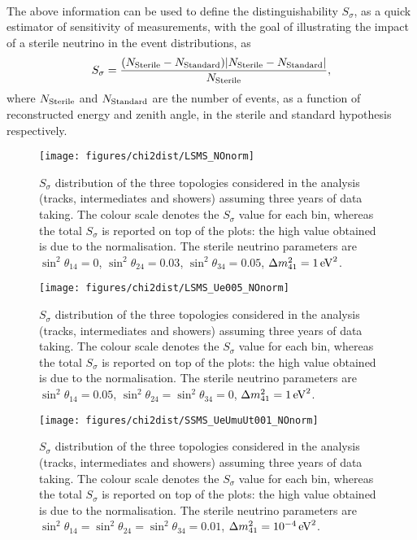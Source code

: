 \\
The above information can be used to define the distinguishability $S_\sigma$, as a quick estimator of sensitivity of measurements, with the goal of illustrating the impact of a sterile neutrino in the event distributions, as
\begin{equation}
S_{\sigma} = \frac{(N_{\rm Sterile} - N_{\rm Standard}) |N_{\rm Sterile} - N_{\rm Standard}|}{N_{\rm Sterile} },
\end{equation}
where $N_{\rm Sterile}$ and $N_{\rm Standard}$ are the number of events, as a function of reconstructed energy and zenith angle, in the sterile and standard hypothesis respectively.
\begin{figure}
	\centering
	\texttt{[image: figures/chi2dist/LSMS\_NOnorm]}
	\caption{$S_\sigma$ distribution of the three topologies considered in the analysis (tracks, intermediates and showers) assuming three years of data taking. The colour scale denotes the $S_\sigma$ value for each bin, whereas the total $S_\sigma$ is reported on top of the plots: the high value obtained is due to the normalisation. The sterile neutrino parameters are $\sin^2\theta_{14} = 0$, $\sin^2\theta_{24} = 0.03$,  $\sin^2\theta_{34} = 0.05$, $\Delta m_{41}^2 = 1 \, \rm{eV}^2$.}
	\label{fig:chi2paperstd3years}
\end{figure}
\begin{figure}
	\centering
	\texttt{[image: figures/chi2dist/LSMS\_Ue005\_NOnorm]}
	\caption{$S_\sigma$ distribution of the three topologies considered in the analysis (tracks, intermediates and showers) assuming three years of data taking. The colour scale denotes the $S_\sigma$ value for each bin, whereas the total $S_\sigma$ is reported on top of the plots: the high value obtained is due to the normalisation. The sterile neutrino parameters are $\sin^2\theta_{14} = 0.05$,  $\sin^2\theta_{24} = \sin^2\theta_{34} = 0$, $\Delta m_{41}^2 = 1 \, \rm{eV}^2$.}
	\label{fig:chi2paperue43years}
\end{figure}
\begin{figure}
	\centering
	\texttt{[image: figures/chi2dist/SSMS\_UeUmuUt001\_NOnorm]}
	\caption{$S_\sigma$ distribution of the three topologies considered in the analysis (tracks, intermediates and showers) assuming three years of data taking. The colour scale denotes the $S_\sigma$ value for each bin, whereas the total $S_\sigma$ is reported on top of the plots: the high value obtained is due to the normalisation. The sterile neutrino parameters are $\sin^2\theta_{14} = \sin^2\theta_{24} = \sin^2\theta_{34} = 0.01$,  $\Delta m_{41}^2 = 10^{-4} \, \rm{eV}^2$.}
	\label{fig:chi2paperlowmass3years}
\end{figure}
